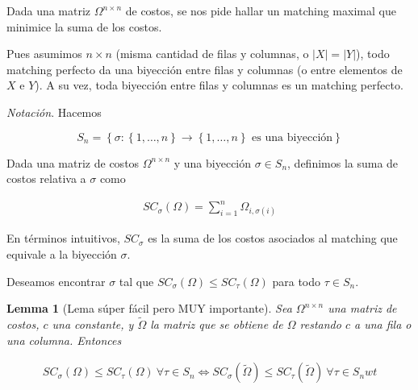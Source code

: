 \documentclass[a4paper]{article}
\newtheorem{lemma}{Lemma}
\newtheorem{lemma}{Lemma}
\begin{document}
Dada una matriz $\Omega^{n\times n}$ de costos, se nos pide hallar un matching
maximal que minimice la suma de los costos.

Pues asumimos $n \times n$ (misma cantidad de filas y columnas, o $|X| = |Y|$),
todo matching perfecto da una biyección entre filas y columnas (o entre 
elementos de $X$ e $Y$). A su vez, toda biyección entre filas y columnas 
es un matching perfecto. 

\textit{Notación}. Hacemos 

$$S_n = \left\{ \sigma : \left\{ 1, \ldots, n
\right\} \to  \left\{ 1, \ldots, n \right\}  \text{ es una biyección} \right\} $$

Dada una matriz de costos $\Omega^{n \times  n}$ y una biyección $\sigma \in S_n$,
definimos la suma de costos relativa a $\sigma$ como 

\begin{align*}
    SC_{\sigma}(\Omega) = \sum_{i = 1}^{n} \Omega_{i, \sigma(i)}
\end{align*}

En términos intuitivos, $SC_\sigma$ es la suma de los costos asociados 
al matching que equivale a la biyección $\sigma$. 

Deseamos encontrar $\sigma$ tal que $SC_{\sigma}(\Omega) \leq SC_{\tau}(\Omega)$ para todo $\tau \in S_n$.

\begin{lemma}[Lema súper fácil pero MUY importante]
    Sea $\Omega^{n\times n}$ una matriz de costos, $c$ una constante, y 
    $\widetilde{ \Omega }$ la matriz que se obtiene de $\Omega$
    restando $c$ a una fila o una columna. Entonces 

    \begin{align*}
        SC_{\sigma}(\Omega) \leq SC_{\tau}(\Omega) ~ \forall \tau \in S_n \iff SC_{\sigma}(\widetilde{ \Omega }) \leq SC_{\tau} (\widetilde{ \Omega }) ~ \forall \tau \in S_n wt
    \end{align*}
\end{lemma}
\end{document}
